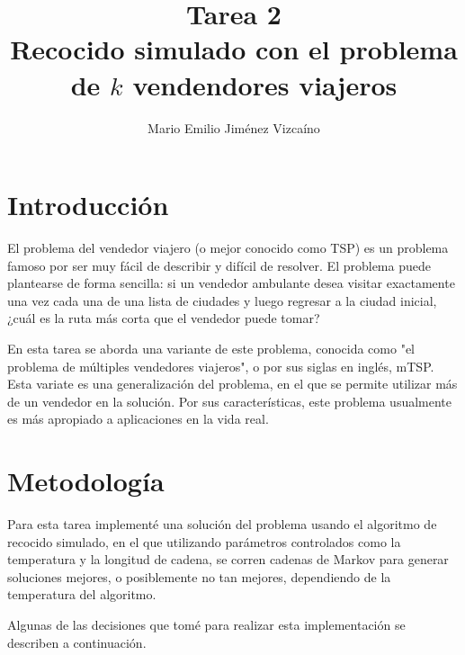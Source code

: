 \documentclass[sigconf,authorversion,nonacm]{acmart}
\begin{document}
\title{Tarea 2 \\ Recocido simulado con el problema de $k$ vendendores viajeros}

\author{Mario Emilio Jiménez Vizcaíno}

\maketitle

\section{Introducción}
El problema del vendedor viajero (o mejor conocido como TSP) es un problema famoso por ser muy fácil de describir y difícil de resolver. \cite{hoffman2013traveling} El problema puede plantearse de forma sencilla: si un vendedor ambulante desea visitar exactamente una vez cada una de una lista de ciudades y luego regresar a la ciudad inicial, ¿cuál es la ruta más corta que el vendedor puede tomar?

En esta tarea se aborda una variante de este problema, conocida como "el problema de múltiples vendedores viajeros", o por sus siglas en inglés, mTSP. Esta variate es una generalización del problema, en el que se permite utilizar más de un vendedor en la solución. Por sus características, este problema usualmente es más apropiado a aplicaciones en la vida real.\cite{bektas2006multiple}

\section{Metodología}
Para esta tarea implementé una solución del problema usando el algoritmo de recocido simulado, en el que utilizando parámetros controlados como la temperatura y la longitud de cadena, se corren cadenas de Markov para generar soluciones mejores, o posiblemente no tan mejores, dependiendo de la temperatura del algoritmo.

Algunas de las decisiones que tomé para realizar esta implementación se describen a continuación.
\end{document}
